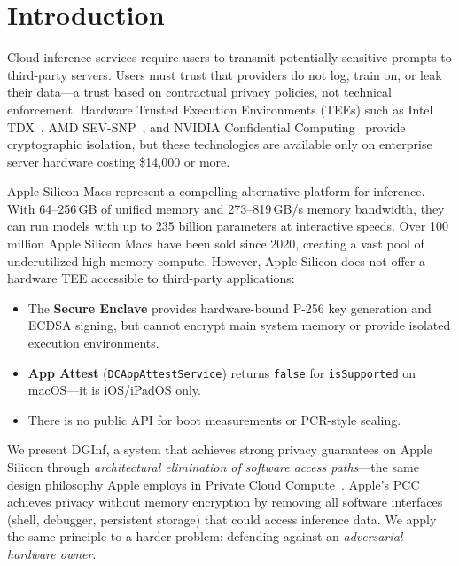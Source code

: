\documentclass[10pt,twocolumn,letterpaper]{article}
\begin{document}
\section{Introduction}

Cloud inference services require users to transmit potentially sensitive prompts to third-party servers. Users must trust that providers do not log, train on, or leak their data---a trust based on contractual privacy policies, not technical enforcement. Hardware Trusted Execution Environments (TEEs) such as Intel TDX~\cite{intel-tdx}, AMD SEV-SNP~\cite{amd-sev}, and NVIDIA Confidential Computing~\cite{nvidia-cc} provide cryptographic isolation, but these technologies are available only on enterprise server hardware costing \$14,000 or more.

Apple Silicon Macs represent a compelling alternative platform for inference. With 64--256\,GB of unified memory and 273--819\,GB/s memory bandwidth, they can run models with up to 235 billion parameters at interactive speeds. Over 100 million Apple Silicon Macs have been sold since 2020, creating a vast pool of underutilized high-memory compute. However, Apple Silicon does not offer a hardware TEE accessible to third-party applications:

\begin{itemize}[leftmargin=*,itemsep=2pt,topsep=2pt]
    \item The \textbf{Secure Enclave} provides hardware-bound P-256 key generation and ECDSA signing, but cannot encrypt main system memory or provide isolated execution environments.
    \item \textbf{App Attest} (\texttt{DCAppAttestService}) returns \texttt{false} for \texttt{isSupported} on macOS---it is iOS/iPadOS only.
    \item There is no public API for boot measurements or PCR-style sealing.
\end{itemize}

We present DGInf, a system that achieves strong privacy guarantees on Apple Silicon through \emph{architectural elimination of software access paths}---the same design philosophy Apple employs in Private Cloud Compute~\cite{apple-pcc}. Apple's PCC achieves privacy without memory encryption by removing all software interfaces (shell, debugger, persistent storage) that could access inference data. We apply the same principle to a harder problem: defending against an \emph{adversarial hardware owner}.
\end{document}
